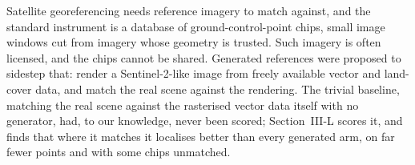 %
%
%
%


Satellite georeferencing needs reference imagery to match against, and the standard
instrument is a database of ground-control-point chips, small image windows cut from
imagery whose geometry is trusted. Such imagery is often licensed, and the chips cannot be shared. Generated references were proposed to sidestep that: render a Sentinel-2-like image
from freely available vector and land-cover data, and match the real scene against the
rendering. The trivial baseline, matching the real scene against the rasterised vector
data itself with no generator, had, to our knowledge, never been scored; Section~III-L scores it, and finds
that where it matches it localises better than every generated arm, on far fewer points
and with some chips unmatched.

